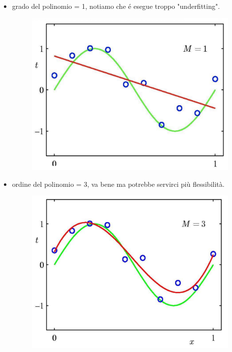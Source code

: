 \documentclass{article}
\begin{document}
\begin{itemize}
    \item grado del polinomio = 1, notiamo che é esegue troppo "underfitting".
    \begin{figure}[H]
    \centering
    \includegraphics[scale=0.3]{Images/polgrado1underfit.png}
    \end{figure}
    \clearpage
    
    \item ordine del polinomio = 3, va bene ma potrebbe servirci più flessibilità.
    \begin{figure}[H]
    \centering
    \includegraphics[scale=0.3]{Images/3gradepol.png}
    \end{figure}
    

\end{itemize}
\end{document}
